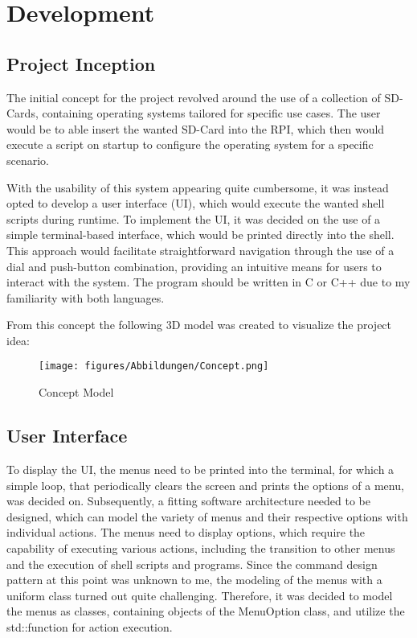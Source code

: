 \chapter{Development}\label{ch:development}
\lstset{style=inline}

\section{Project Inception}
The initial concept for the project revolved around the use of a collection of SD-Cards, containing operating systems tailored for specific use cases.
The user would be to able insert the wanted SD-Card into the RPI, which then would execute a script on startup to configure the operating system for a specific scenario.

With the usability of this system appearing quite cumbersome, it was instead opted to develop a user interface (UI), which would execute the wanted shell scripts during runtime.
To implement the UI, it was decided on the use of a simple terminal-based interface, which would be printed directly into the shell. 
This approach would facilitate straightforward navigation through the use of a dial and push-button combination, providing an intuitive means for users to interact with the system. 
The program should be written in C or C++ due to my familiarity with both languages.

From this concept the following 3D model was created to visualize the project idea:

\begin{figure}[h]
    \centering
    \texttt{[image: figures/Abbildungen/Concept.png]}
    \caption{Concept Model}
    \label{fig:concept}
\end{figure}

\section{User Interface}\label{sec:ui}
To display the UI, the menus need to be printed into the terminal, for which a simple loop, that periodically clears the screen and prints the options of a menu, was decided on.
Subsequently, a fitting software architecture needed to be designed, which can model the variety of menus and their respective options with individual actions.
The menus need to display options, which require the capability of executing various actions, including the transition to other menus and the execution of shell scripts and programs.
Since the command design pattern at this point was unknown to me, the modeling of the menus with a uniform class turned out quite challenging.
Therefore, it was decided to model the menus as classes, containing objects of the MenuOption class, and utilize the std::function for action execution.


